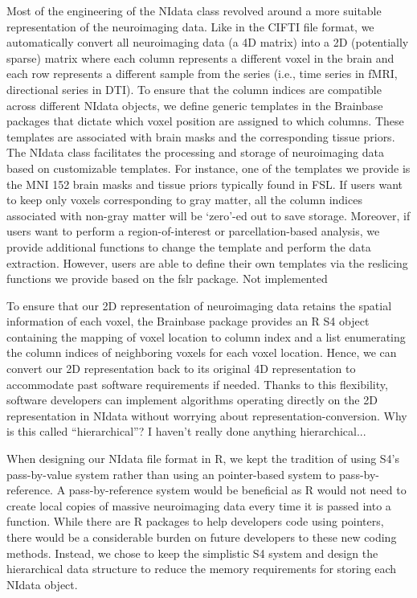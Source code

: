 \documentclass{nature}
\begin{document}
Most of the engineering of the NIdata class revolved around a more suitable
representation of the neuroimaging data. Like in the CIFTI file
format\cite{Glasser2013The},
we automatically convert all neuroimaging data (a 4D matrix)
into a 2D (potentially sparse) matrix where each
column represents a different voxel
in the brain and each row represents
a different sample from the series (i.e., time series in fMRI, directional
series in DTI). To ensure that the column indices are
compatible across different NIdata objects, we define generic templates in the
Brainbase packages that dictate which voxel position are assigned to which
columns.
These templates are associated with brain masks and the corresponding tissue
priors. 
The NIdata class facilitates the processing
and storage of neuroimaging data based on customizable
templates.
For instance, one of the templates we provide is the MNI 152 brain masks and
tissue priors typically found in FSL.
If users want to keep only voxels corresponding to gray matter, all the column
indices associated with non-gray matter will be `zero'-ed out to save storage.
Moreover, if users want to perform a
region-of-interest or parcellation-based analysis, we provide
additional functions to change the template and perform the data extraction.
However, users are able to define their own templates via the reslicing functions
we provide based on the fslr package. {\color{red}Not implemented}

To ensure that our 2D representation of neuroimaging data retains the
spatial information of each voxel, the Brainbase package provides
an R S4 object containing the mapping of voxel location to column index and
a list enumerating the column indices of neighboring voxels for each voxel
location. Hence, we can convert our 2D representation back to its original
4D representation to accommodate past software requirements if needed.
Thanks to this flexibility, software developers can
implement algorithms operating directly on the 2D representation in
NIdata without worrying about representation-conversion. {\color{red}Why is this
called ``hierarchical''? I haven't really done anything hierarchical...}

When designing our NIdata file format in R, we kept the tradition of using S4's
pass-by-value system rather than using an pointer-based system to pass-by-reference.
A pass-by-reference system would be beneficial as R would not need to 
create local copies of massive neuroimaging data every time it is passed into a
function. While there are R packages to help developers
code using pointers\cite{bengtsson2003r}, there would be a 
considerable burden on future developers to these new coding methods.
Instead, we chose to keep the simplistic S4 system and design the hierarchical
data structure to reduce the memory requirements for storing each NIdata object.
\end{document}
